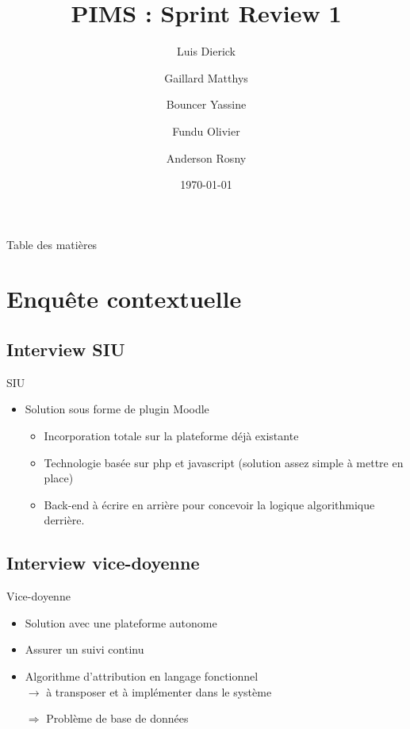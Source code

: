 \documentclass[numbering=fraction]{beamer}
\title{PIMS : Sprint Review 1}
\author[PIMS]{Luis Dierick \and Gaillard Matthys \and Bouncer Yassine \and Fundu Olivier \and Anderson Rosny }
\institute{Université de Namur}
\date{\today}
\begin{document}
\begin{frame}[plain]{}
    \maketitle
\end{frame}

\begin{frame}{Table des matières}
    \tableofcontents
\end{frame}

\section{Enquête contextuelle}
\subsection{Interview SIU}

\begin{frame}{SIU}
    \begin{itemize}
        \item Solution sous forme de plugin Moodle
        \begin{itemize}
            \item Incorporation totale sur la plateforme déjà existante
            \item Technologie basée sur php et javascript (solution assez simple à mettre en place)
            \item Back-end à écrire en arrière pour concevoir la logique algorithmique derrière.
        \end{itemize}
    \end{itemize}
\end{frame}

\subsection{Interview vice-doyenne}


\begin{frame}{Vice-doyenne}
\begin{itemize}
    \item Solution avec une plateforme autonome
    \item Assurer un suivi continu
    \item Algorithme d'attribution en langage fonctionnel \\ $\rightarrow$ à transposer et à implémenter dans le système
    \item[$\Rightarrow$] Problème de base de données
\end{itemize}
\end{frame}
\end{document}
